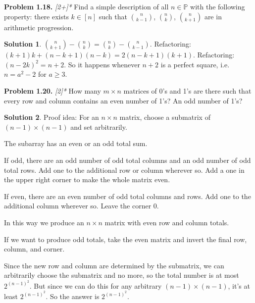 \documentclass[11pt]{article}
\theoremstyle{definition}
\newtheorem*{solution}{Solution}
\renewcommand{\P}{\mathbb{P}}
\newcounter{probnum}
\newcommand{\problem}[1]{%
  \setcounter{probnum}{#1}%
  \medskip
  \noindent\textbf{Problem 1.#1.}\quad
}
\begin{document}
\problem{18} \textit{[2+]*}
Find a simple description of all $n\in\P$ with the following property: there exists
$k\in[n]$ such that $\binom{n}{k-1}$, $\binom{n}{k}$, $\binom{n}{k+1}$ are in
arithmetic progression.

\begin{solution}
$\binom{n}{k+1} - \binom{n}{k} = \binom{n}{k} - \binom{n}{k-1}$.
Refactoring: $(k+1)k + (n-k+1)(n-k) = 2(n-k+1)(k+1)$.
Refactoring: $(n-2k)^2 = n+2$.
So it happens whenever $n+2$ is a perfect square, i.e.\ $n = a^2 - 2$ for $a \geq 3$.
\end{solution}

\problem{20} \textit{[2]*}
How many $m\times n$ matrices of 0's and 1's are there such that every row and column
contains an even number of 1's? An odd number of 1's?

\begin{solution}
Proof idea: For an $n\times n$ matrix, choose a submatrix of $(n-1)\times(n-1)$
and set arbitrarily.

The subarray has an even or an odd total sum.

If odd, there are an odd number of odd total columns and an odd number of odd total
rows. Add one to the additional row or column wherever so. Add a one in the upper
right corner to make the whole matrix even.

If even, there are an even number of odd total columns and rows. Add one to the
additional column wherever so. Leave the corner 0.

In this way we produce an $n\times n$ matrix with even row and column totals.

If we want to produce odd totals, take the even matrix and invert the final row,
column, and corner.

Since the new row and column are determined by the submatrix, we can arbitrarily
choose the submatrix and no more, so the total number is at most $2^{(n-1)^2}$. But
since we can do this for any arbitrary $(n-1)\times(n-1)$, it's at least
$2^{(n-1)^2}$. So the answer is $2^{(n-1)^2}$.
\end{solution}

\end{document}

